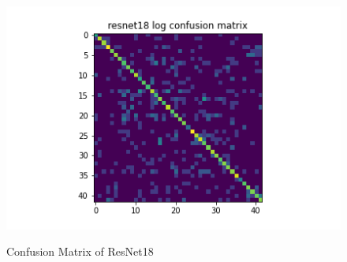 \begin{figure}[t]
\begin{minipage}[b]{.5\linewidth}
  \end{minipage}
  \hfill
  \begin{minipage}[b]{.5\linewidth}
    \centering

    {\includegraphics[width=1.2\textwidth]{figs/conf_matrix/resnet18_log_conf.png}}
  \end{minipage}

  \caption{Confusion Matrix of ResNet18}
  \label{fig:resnet18_conf}
  \vspace{0.2in}
\end{figure}

